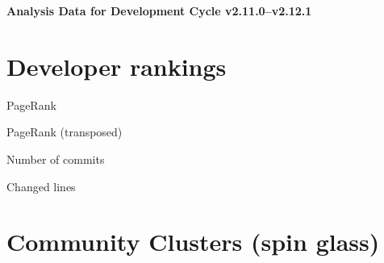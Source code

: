 \documentclass{article}
\begin{document}
\setlength{\parindent}{0pt}
\begin{center}
\begin{Large}
\textbf{Analysis Data for Development Cycle v2.11.0--v2.12.1}
\end{Large}
\end{center}
\section{Developer rankings}
\begin{small}\renewcommand{\tabcolsep}{1pt}
\begin{minipage}{0.5\linewidth}
PageRank\\

\end{minipage}%
\begin{minipage}{0.5\linewidth}
PageRank (transposed)\\

\end{minipage}

\renewcommand{\tabcolsep}{5pt}
\begin{minipage}{0.5\linewidth}
Number of commits\\

\end{minipage}%
\begin{minipage}{0.5\linewidth}
Changed lines\\

\end{minipage}
\end{small}
\newpage\section{Community Clusters (spin glass)}
\end{document}
